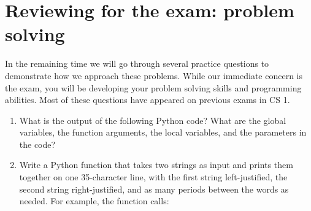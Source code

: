 \documentclass[letterpaper,10pt,english]{sphinxmanual}
\begin{document}
\section{Reviewing for the exam:  problem solving}
\label{\detokenize{lecture_notes/lec07_modules_images:reviewing-for-the-exam-problem-solving}}
In the remaining time we will go through several practice questions to
demonstrate how we approach these problems.  While our immediate
concern is the exam, you will be developing your problem solving
skills and programming abilities.  Most of these questions have
appeared on previous exams in CS 1.
\begin{enumerate}
\def\theenumi{\arabic{enumi}}
\def\labelenumi{\theenumi .}
\makeatletter\def\p@enumii{\p@enumi \theenumi .}\makeatother
\item {} 
What is the  output of the following Python code?  What
are the global variables, the function arguments, the local
variables, and the parameters in the code?

\begin{sphinxVerbatim}[commandchars=\\\{\}]

  
       
     
       

 
  
 
\end{sphinxVerbatim}

\item {} 
Write a Python function that takes two strings as input and
prints them together on one 35-character line, with the first string
left-justified, the second string right-justified, and as many
periods between the words as needed.  For example, the function
calls:

\begin{sphinxVerbatim}[commandchars=\\\{\}]
 
 
\end{sphinxVerbatim}


\end{enumerate}
\end{document}
